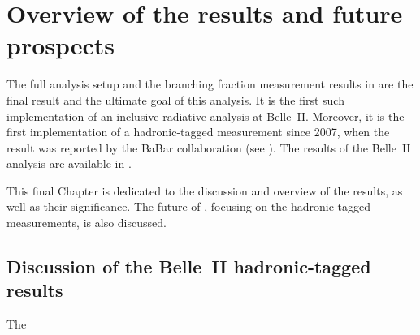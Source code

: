 \chapter{Overview of the results and future prospects}\label{ch:overview}

The full analysis setup and the branching fraction measurement results in 
are the final result and the ultimate goal of this analysis.
It is the first such implementation of an inclusive radiative analysis at Belle~II.
Moreover, it is the first implementation of a hadronic-tagged \BtoXsgamma measurement since 2007, 
when the result was reported by the BaBar collaboration (see ).
The results of the Belle~II analysis are available in \cite{Belle-II:2022hys}.

This final Chapter is dedicated to the discussion and overview of the results, as well as their significance.
The future of \BtoXsgamma, focusing on the hadronic-tagged measurements, is also discussed.

\section{Discussion of the Belle~II hadronic-tagged \texorpdfstring{\BtoXsgamma}{B->Xs gamma} results}

The